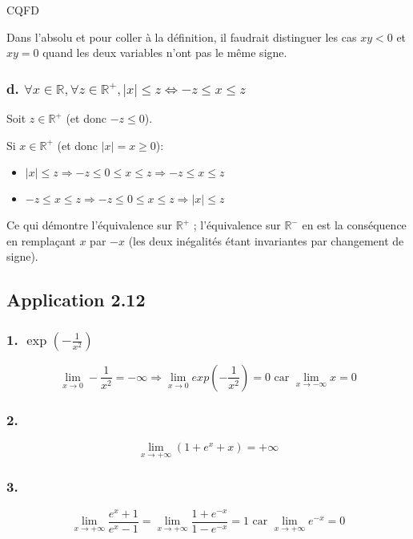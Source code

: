 \documentclass{report}
\begin{document}
CQFD

Dans l'absolu et pour coller à la définition, il faudrait distinguer les cas $xy<0$ et $xy=0$ quand les deux variables n'ont pas
le même signe.


\subsubsection*{d. $\forall x \in \mathbb{R}, \forall z \in \mathbb{R}^{+}, |x| \leq z \Longleftrightarrow -z \leq x \leq z$}

Soit $z \in \mathbb{R}^{+}$ (et donc $-z \leq 0$).

Si $x \in \mathbb{R}^{+}$ (et donc $|x|=x \geq 0$):

\begin{itemize}
	\item $|x| \leq z \Longrightarrow -z \leq 0 \leq x \leq z \Longrightarrow -z \leq x \leq z$
	\item $-z \leq x \leq z \Longrightarrow -z \leq 0 \leq x \leq z \Longrightarrow |x| \leq z$
\end{itemize}

Ce qui démontre l'équivalence sur $\mathbb{R}^{+}$ ; l'équivalence sur $\mathbb{R}^{-}$ en est la conséquence
en remplaçant $x$ par $-x$ (les deux inégalités étant invariantes par changement de signe).

\subsection*{Application 2.12}

\subsubsection*{1. $\exp(-\frac{1}{x^2})$}
\begin{displaymath}
	\lim_{x \rightarrow 0} -\frac{1}{x^2} =-\infty \Longrightarrow 	\lim_{x \rightarrow 0} exp(-\frac{1}{x^2})= 0 \text{ car } \lim_{x \rightarrow -\infty} x = 0
\end{displaymath}

\subsubsection*{2.}
\begin{displaymath}
	\lim_{x \rightarrow +\infty} (1 + e^x + x)= +\infty
\end{displaymath}

\subsubsection*{3.}
\begin{displaymath}
	\lim_{x \rightarrow +\infty} \frac{e^x+1}{e^x-1}= \lim_{x \rightarrow +\infty} \frac{1+e^{-x}}{1-e^{-x}} = 1 \text{ car }
	\lim_{x \rightarrow +\infty} e^{-x} = 0
\end{displaymath}
\end{document}
